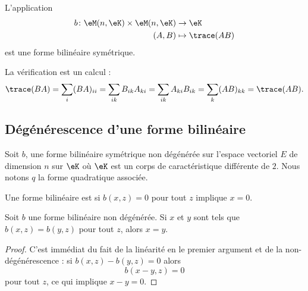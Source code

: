 \begin{example}       \label{EXooKFBOooJjXZwu}
	L'application
	\begin{equation}
		\begin{aligned}
			b\colon \eM(n,\eK)\times \eM(n,\eK) & \to \eK            \\
			(A,B)                               & \mapsto \trace(AB)
		\end{aligned}
	\end{equation}
	est une forme bilinéaire symétrique.

	La vérification est un calcul :
	\begin{equation}
		\trace(BA)=\sum_{i}(BA)_{ii}=\sum_{ik}B_{ik}A_{ki}=\sum_{ik}A_{ki}B_{ik}=\sum_k(AB)_{kk}=\trace(AB).
	\end{equation}
\end{example}

\subsection{Dégénérescence d'une forme bilinéaire}

Soit \( b\), une forme bilinéaire symétrique non dégénérée  sur l'espace vectoriel \( E\) de dimension \( n\) sur \( \eK\) où \( \eK\) est un corps de caractéristique différente de \( 2\). Nous notons \( q\) la forme quadratique associée.

\begin{definition}      \label{DEFooNUBFooLfCqaK}
	Une forme bilinéaire est  si \( b(x,z)=0\) pour tout \( z\) implique \( x=0\).
\end{definition}

\begin{lemma}   \label{LemyKJpVP}
	Soit \( b\) une forme bilinéaire non dégénérée. Si \( x\) et \( y\) sont tels que \( b(x,z)=b(y,z)\) pour tout \( z\), alors \( x=y\).
\end{lemma}

\begin{proof}
	C'est immédiat du fait de la linéarité en le premier argument et de la non-dégénérescence : si \( b(x,z)-b(y,z)=0\) alors
	\begin{equation}
		b(x-y,z)=0
	\end{equation}
	pour tout \( z\), ce qui implique \( x-y=0\).
\end{proof}

